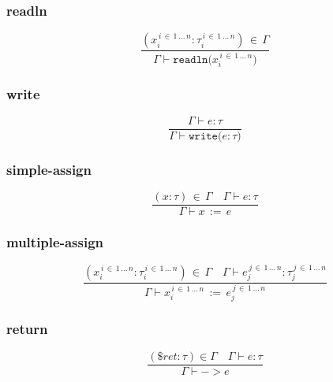 \documentclass[a4paper,12pt]{article}
\newcommand\resw[1]{\mathtt{#1}}
\newcommand\mi[1]{\mathit{#1}}
\begin{document}
	\subsubsection{readln}
	\[
		\frac{(x_{i}^{\, i \, \in \, 1 \, \dots \, n} \colon \tau_{i}^{\, i \, \in \, 1 \, \dots \, n}) \, \in \, \Gamma}%
		{\Gamma \vdash \resw{readln(} \mi{x}_{i}^{\, i \, \in \, 1 \, \dots \, n} \resw{)}}
	\]
    \subsubsection{write}
    \[
        \frac{\Gamma \vdash \mi{e} \colon \tau}%
        {\Gamma \vdash \resw{write(} \mi{e} \colon \tau \resw{)}}
    \]
    \subsubsection{simple-assign}
    \[
        \frac{(\mi{x} \colon \tau) \, \in \, \Gamma \quad \Gamma \vdash \mi{e} \colon \tau}%
        {\Gamma \vdash \mi{x} \, \resw{:=} \, \mi{e}}
    \]
    \subsubsection{multiple-assign}
     \[
        \frac{(\mi{x}_{i}^{\, i \, \in \, 1 \, \dots \, n} \colon \tau_{i}^{\, i \, \in \, 1 \, \dots \, n}) \, \in \, \Gamma \quad \Gamma \vdash \mi{e}_{j}^{\, j \, \in \, 1 \, \dots \, n}%
        \colon \tau_{j}^{\, j \, \in \, 1 \, \dots \, n}}%
        {\Gamma \vdash \mi{x}_{i}^{\, i \, \in \, 1 \, \dots \, n} \, \resw{:=} \, \mi{e}_{j}^{\, j \, \in \, 1 \, \dots \, n}}
    \]
    \subsubsection{return}
    \[
    	\frac{(\$\mi{ret} \colon \tau) \in \Gamma \quad \Gamma \vdash \mi{e} \colon \tau}%
	{\Gamma \vdash \resw{-\!\!>} \mi{e}}
    \]
\end{document}
